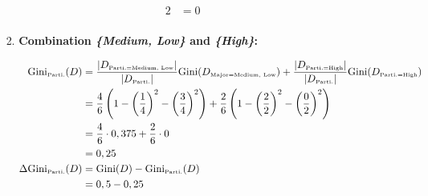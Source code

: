 \documentclass[
english,
smallborders
]{i6prcsht}
\newcommand{\OfSpecificValue}[3]{_{\text{\tiny #1#2#3}}}
\newcommand{\OfAttribute}[1]{_{\text{\tiny #1}}}
\begin{document}
\begin{solution}
\begin{enumerate}
\begin{enumerate}
\begin{enumerate}
\begin{enumerate}
\begin{alignat*}{2}
						                                                                 & = 0                                                                                                                                                                                                                                                        \\
					                        \end{alignat*}
					                  \item \textbf{Combination \textit{\{Medium, Low\}} and \textit{\{High\}}:}

					                        \begin{alignat*}{2}
						                        \text{Gini}\OfAttribute{Parti.}(D)       & = \frac{|D\OfSpecificValue{Parti.}{=}{Medium, Low}|}{|D\OfAttribute{Parti.}|} \text{Gini}(D\OfSpecificValue{Major}{=}{Medium, Low}) + \frac{|D\OfSpecificValue{Parti.}{=}{High}|}{|D\OfAttribute{Parti.}|} \text{Gini}(D\OfSpecificValue{Parti.}{=}{High}) \\
						                                                                 & = \frac{4}{6} \left(1 - \left(\frac{1}{4}\right)^2 - \left(\frac{3}{4}\right)^2\right) + \frac{2}{6} \left(1 - \left(\frac{2}{2}\right)^2 - \left(\frac{0}{2}\right)^2\right)                                                                              \\
						                                                                 & = \frac{4}{6} \cdot 0,375 + \frac{2}{6} \cdot 0                                                                                                                                                                                                            \\
						                                                                 & = 0,25                                                                                                                                                                                                                                                     \\
						                        \Delta\text{Gini}\OfAttribute{Parti.}(D) & = \text{Gini}(D) - \text{Gini}\OfAttribute{Parti.}(D)                                                                                                                                                                                                      \\
						                                                                 & = 0,5 - 0,25                                                                                                                                                                                                                                               \\

\end{alignat*}
\end{enumerate}
\end{enumerate}
\end{enumerate}
\end{enumerate}
\end{solution}
\end{document}

